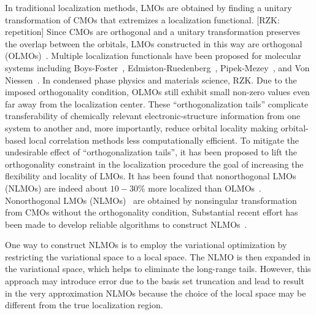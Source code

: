 \documentclass[aps,prl,reprint,amsmath,amssymb]{revtex4-1}
\begin{document}
In traditional localization methods, LMOs are obtained by finding a unitary transformation of CMOs that extremizes a localization functional. [RZK: repetition]
Since CMOs are orthogonal and a unitary transformation preserves the overlap between the orbitals, LMOs constructed in this way are orthogonal (OLMOs)~\cite{weinstein1971localized}.
Multiple localization functionals have been proposed for molecular systems including Boys-Foster~\cite{boys1960construction}, Edmiston-Ruedenberg~\cite{bytautas2002electron, bytautas2003split, edmiston1963localized}, Pipek-Mezey~\cite{pipek1989a_fast}, and Von Niessen~\cite{niessen1972density}. In condensed phase physics and materials science, RZK. 
%
Due to the imposed orthogonality condition, OLMOs still exhibit small non-zero values even far away from the localization center. 
These ``orthogonalization tails'' complicate transferability of chemically relevant electronic-structure information from one system to another and, more importantly, reduce orbital locality making orbital-based local correlation methods less computationally efficient.
To mitigate the undesirable effect of ``orthogonalization tails'', it has been proposed to lift the orthogonality constraint in the localization procedure the goal of increasing the flexibility and locality of LMOs. 
It has been found that nonorthogonal LMOs (NLMOs) are indeed about $10-30 \%$ more localized than OLMOs~\cite{feng2004An_efficient, liu2000nonorthogonal}. 
Nonorthogonal LMOs (NLMOs)~\cite{anderson1968self, diner1968fully, magnasco1974localized, payne1977hartree, mehler1977self} are obtained by nonsingular transformation from CMOs without the orthogonality condition, 
Substantial recent effort has been made to develop reliable algorithms to construct NLMOs~\cite{feng2004An_efficient, liu2000nonorthogonal, peng2013effective, hoyvik2017generalising}. %

One way to construct NLMOs is to employ the variational optimization by restricting the variational space to a local space.
The NLMO is then expanded in the variational space, which helps to eliminate the long-range tails.
However, this approach may introduce error due to the basis set truncation and lead to result in the very approximation NLMOs because the choice of the local space may be different from the true localization region.
\end{document}
